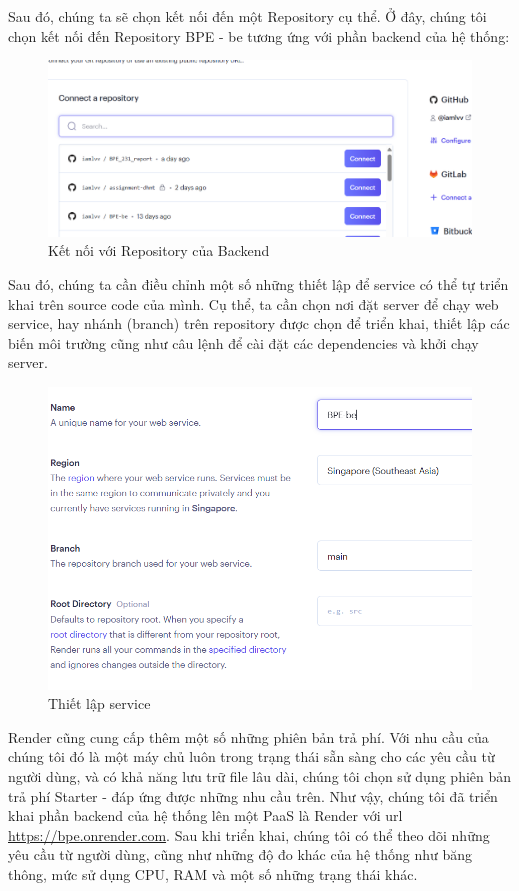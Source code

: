 Sau đó, chúng ta sẽ chọn kết nối đến một Repository cụ thể. Ở đây, chúng tôi chọn kết nối đến Repository BPE - be tương ứng với phần backend của hệ thống:
\begin{figure}[H]
    \centering
    \includegraphics[width=0.7\linewidth]{Content/Hiện thực hệ thống/images/chooserepo.png}
    \vspace{0.5cm}
    \caption{Kết nối với Repository của Backend}
    \label{fig:Kết nối với Repository của Backend}
\end{figure}
Sau đó, chúng ta cần điều chỉnh một số những thiết lập để service có thể tự triển khai trên source code của mình. Cụ thể, ta cần chọn nơi đặt server để chạy web service, hay nhánh (branch) trên repository được chọn để triển khai, thiết lập các biến môi trường cũng như câu lệnh để cài đặt các dependencies và khởi chạy server.
\begin{figure}[H]
    \centering
    \includegraphics[width=0.7\linewidth]{Content/Hiện thực hệ thống/images/config.png}
    \vspace{0.5cm}
    \caption{Thiết lập service}
    \label{fig:Thiết lập service}
\end{figure}
Render cũng cung cấp thêm một số những phiên bản trả phí. Với nhu cầu của chúng tôi đó là một máy chủ luôn trong trạng thái sẵn sàng cho các yêu cầu từ người dùng, và có khả năng lưu trữ file lâu dài, chúng tôi chọn sử dụng phiên bản trả phí Starter - đáp ứng được những nhu cầu trên.
\newline
Như vậy, chúng tôi đã triển khai phần backend của hệ thống lên một PaaS là Render với url \url{https://bpe.onrender.com}. Sau khi triển khai, chúng tôi có thể theo dõi những yêu cầu từ người dùng, cũng như những độ đo khác của hệ thống như băng thông, mức sử dụng CPU, RAM và một số những trạng thái khác.

